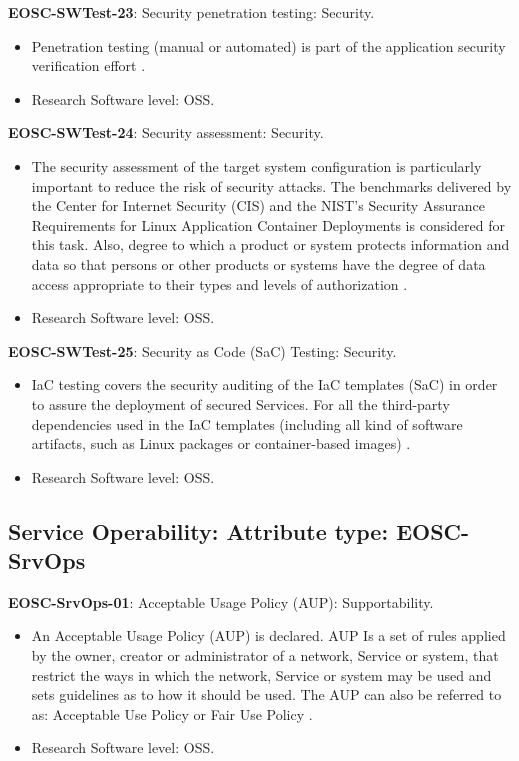 \textbf{EOSC-SWTest-23}: Security penetration testing: Security.

\begin{itemize}
    \item Penetration testing (manual or automated) is part of the application security verification effort \cite{orviz_fernandez_eosc-synergy_2020}.
    \item Research Software level: OSS.
\end{itemize}

\textbf{EOSC-SWTest-24}: Security assessment: Security.

\begin{itemize}
    \item The security assessment of the target system configuration is particularly important to reduce the risk of security attacks. The benchmarks delivered by the Center for Internet Security (CIS) and the NIST's Security Assurance Requirements for Linux Application Container Deployments is considered for this task. Also, degree to which a product or system protects information and data so that persons or other products or systems have the degree of data access appropriate to their types and levels of authorization \cite{iso_25010_2011_2017,orviz_fernandez_eosc-synergy_2020}.
    \item Research Software level: OSS.
\end{itemize}

\textbf{EOSC-SWTest-25}: Security as Code (SaC) Testing: Security.

\begin{itemize}
    \item IaC testing covers the security auditing of the IaC templates (SaC) in order to assure the deployment of secured Services. For all the third-party dependencies used in the IaC templates (including all kind of software artifacts, such as Linux packages or container-based images) \cite{orviz_fernandez_eosc-synergy_2020}.
    \item Research Software level: OSS.
\end{itemize}

\subsection{Service Operability: Attribute type: EOSC-SrvOps}

\textbf{EOSC-SrvOps-01}: Acceptable Usage Policy (AUP): Supportability.

\begin{itemize}
    \item An Acceptable Usage Policy (AUP) is declared. AUP Is a set of rules applied by the owner, creator or administrator of a network, Service or system, that restrict the ways in which the network, Service or system may be used and sets guidelines as to how it should be used. The AUP can also be referred to as: Acceptable Use Policy or Fair Use Policy \cite{orviz_fernandez_eosc-synergy_2020}.
    \item Research Software level: OSS.
\end{itemize}

